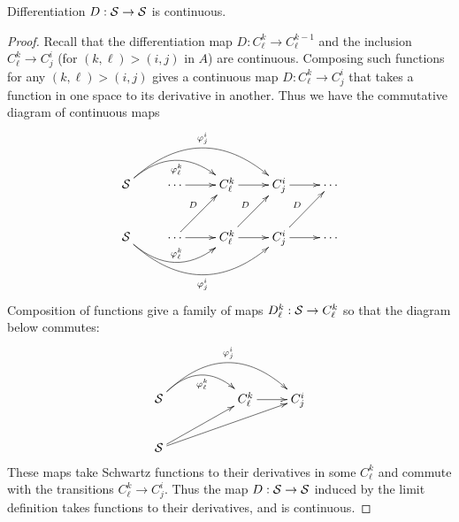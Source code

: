       \begin{claim}
        Differentiation $D:\S\rightarrow\S$ is continuous.
        \begin{proof}
          Recall that the differentiation map $D:C^k_\ell\rightarrow C^{k-1}_\ell$ and the inclusion $C^k_\ell\rightarrow C^i_j$ (for $(k,\ell)>(i,j)$ in $A$) are continuous.
           Composing such functions for any $(k,\ell)>(i,j)$ gives a continuous map $D:C^k_\ell\rightarrow C^i_j$ that takes a function in one space to its derivative in another.
          Thus we have the commutative diagram of continuous maps
          \begin{displaymath}
            \xymatrix{
              \S \ar@/^20pt/[rr]_{\varphi^k_\ell} \ar@/^30pt/[rrr]^{\varphi^i_j} & \cdots \ar[r] & C^k_\ell \ar[r] & C^i_j \ar[r] & \cdots \\
              \S \ar@/_20pt/[rr]^{\varphi^k_\ell} \ar@/_30pt/[rrr]_{\varphi^i_j} & \cdots \ar[r] \ar[ur]^D & C^k_\ell \ar[r] \ar[ur]^D & C^i_j \ar[r] \ar[ur]^D & \cdots\\
            }
          \end{displaymath}
          Composition of functions give a family of maps $D^k_\ell:\S\rightarrow C^k_\ell$ so that the diagram below commutes:
          \begin{displaymath}
            \xymatrix{
              \S \ar@/^20pt/[rr]_{\varphi^k_\ell} \ar@/^30pt/[rrr]^{\varphi^i_j} && C^k_\ell \ar[r] & C^i_j \\
              \S \ar[urr] \ar[urrr] \\
            }
          \end{displaymath}
          These maps take Schwartz functions to their derivatives in some $C^k_\ell$ and commute with the transitions $C^k_\ell\rightarrow C^i_j$.
          Thus the map $D:\S\rightarrow\S$ induced by the limit definition takes functions to their derivatives, and is continuous.
        \end{proof}
      \end{claim}


